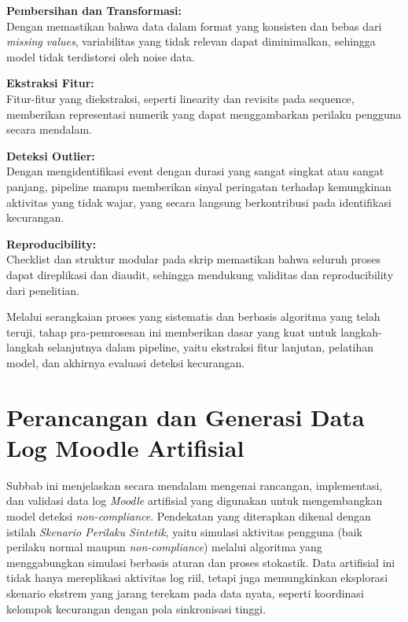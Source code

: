 \textbf{Pembersihan dan Transformasi:} \\
Dengan memastikan bahwa data dalam format yang konsisten dan bebas dari \textit{missing values}, variabilitas yang tidak relevan dapat diminimalkan, sehingga model tidak terdistorsi oleh noise data.

\textbf{Ekstraksi Fitur:} \\
Fitur-fitur yang diekstraksi, seperti linearity dan revisits pada sequence, memberikan representasi numerik yang dapat menggambarkan perilaku pengguna secara mendalam.

\textbf{Deteksi Outlier:} \\
Dengan mengidentifikasi event dengan durasi yang sangat singkat atau sangat panjang, pipeline mampu memberikan sinyal peringatan terhadap kemungkinan aktivitas yang tidak wajar, yang secara langsung berkontribusi pada identifikasi kecurangan.

\textbf{Reproducibility:} \\
Checklist dan struktur modular pada skrip memastikan bahwa seluruh proses dapat direplikasi dan diaudit, sehingga mendukung validitas dan reproducibility dari penelitian.

Melalui serangkaian proses yang sistematis dan berbasis algoritma yang telah teruji, tahap pra-pemrosesan ini memberikan dasar yang kuat untuk langkah-langkah selanjutnya dalam pipeline, yaitu ekstraksi fitur lanjutan, pelatihan model, dan akhirnya evaluasi deteksi kecurangan.

\section{Perancangan dan Generasi Data Log Moodle Artifisial}
\label{sec:perancanganGenerasiDataArtifisial}
Subbab ini menjelaskan secara mendalam mengenai rancangan, implementasi, dan validasi data log \textit{Moodle} artifisial yang digunakan untuk mengembangkan model deteksi \textit{non-compliance}. Pendekatan yang diterapkan dikenal dengan istilah \textit{Skenario Perilaku Sintetik}, yaitu simulasi aktivitas pengguna (baik perilaku normal maupun \textit{non-compliance}) melalui algoritma yang menggabungkan simulasi berbasis aturan dan proses stokastik. Data artifisial ini tidak hanya mereplikasi aktivitas log riil, tetapi juga memungkinkan eksplorasi skenario ekstrem yang jarang terekam pada data nyata, seperti koordinasi kelompok kecurangan dengan pola sinkronisasi tinggi.

